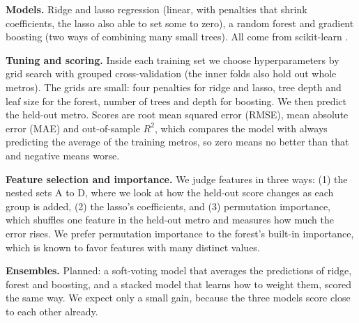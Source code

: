 \documentclass[11pt]{article}
\begin{document}
\textbf{Models.} Ridge and lasso regression (linear, with penalties that shrink coefficients, the lasso also able to set some to zero),
a random forest \cite{breiman2} and gradient boosting (two ways of combining many small trees). All come from scikit-learn
\cite{sklearn}.

\textbf{Tuning and scoring.} Inside each training set we choose hyperparameters by grid search with grouped cross-validation (the
inner folds also hold out whole metros). The grids are small: four penalties for ridge and lasso, tree depth and leaf size for
the forest, number of trees and depth for boosting. We then predict the held-out metro. Scores are root mean squared error (RMSE),
mean absolute error (MAE) and out-of-sample $R^2$, which compares the model with always predicting the average of the training
metros, so zero means no better than that and negative means worse.

\textbf{Feature selection and importance.} We judge features in three ways: (1) the nested sets A to D, where we look at how the
held-out score changes as each group is added, (2) the lasso's coefficients, and (3) permutation importance, which shuffles one
feature in the held-out metro and measures how much the error rises. We prefer permutation importance to the forest's built-in
importance, which is known to favor features with many distinct values.

\textbf{Ensembles.} Planned: a soft-voting model that averages the predictions of ridge, forest and boosting, and a stacked model
that learns how to weight them, scored the same way. We expect only a small gain, because the three models score close to each
other already.
\end{document}
